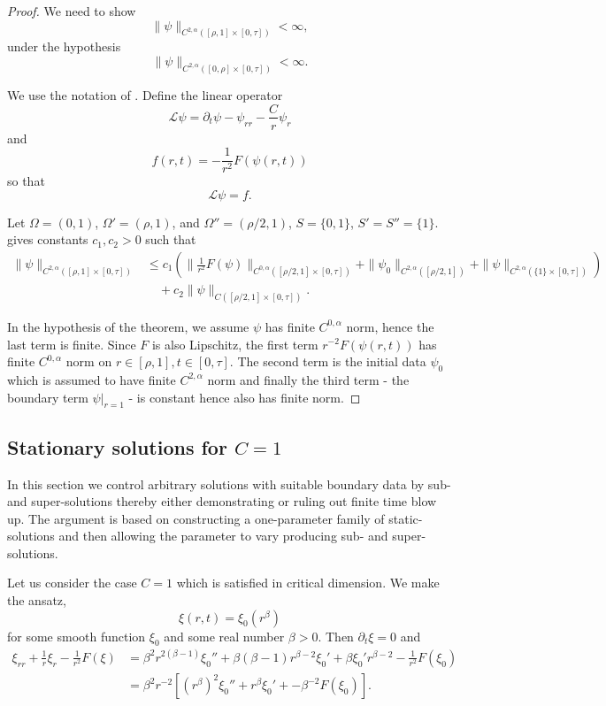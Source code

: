 \documentclass{amsart}
\begin{document}
\begin{proof}
We need to show
\[
\|\psi\|_{C^{2,\alpha}([\rho, 1] \times [0, \tau])} < \infty,
\]
under the hypothesis
\[
\|\psi\|_{C^{2,\alpha}([0, \rho] \times [0, \tau])} < \infty.
\]

We use the notation of \cite[Theorem 10.1]{Ladyzhenskaja:/1967}. Define the linear operator
\[
\mathcal{L} \psi = \partial_t \psi - \psi_{rr} - \frac{C}{r} \psi_r
\]
and
\[
f(r, t) = -\frac{1}{r^2} F(\psi(r, t))
\]
so that
\[
\mathcal{L} \psi = f.
\]

Let \(\Omega = (0, 1)\), \(\Omega' = (\rho, 1)\), and \(\Omega'' = (\rho/2, 1)\), \(S = \{0, 1\}\), \(S' = S'' = \{1\}\). \cite[Theorem 10.1]{Ladyzhenskaja:/1967} gives constants \(c_1, c_2 > 0\) such that
\[
\begin{split}
\|\psi\|_{C^{2,\alpha}([\rho, 1] \times [0, \tau])} &\leq c_1 \left(\|\tfrac{1}{r^2} F(\psi)\|_{C^{0,\alpha}([\rho/2, 1] \times [0, \tau])} + \|\psi_0\|_{C^{2,\alpha}([\rho/2, 1])} + \|\psi\|_{C^{2,\alpha}(\{1\} \times [0, \tau])} \right) \\
&\quad + c_2 \|\psi\|_{C([\rho/2, 1] \times [0, \tau])}.
\end{split}
\]

In the hypothesis of the theorem, we assume \(\psi\) has finite \(C^{0,\alpha}\) norm, hence the last term is finite. Since \(F\) is also Lipschitz, the first term \(r^{-2} F(\psi(r, t))\) has finite \(C^{0,\alpha}\) norm on \(r \in [\rho, 1], t \in [0, \tau]\). The second term is the initial data \(\psi_0\) which is assumed to have finite \(C^{2,\alpha}\) norm and finally the third term - the boundary term \(\psi|_{r=1}\) - is constant hence also has finite norm.
\end{proof}

\subsection*{Stationary solutions for \(C=1\)}

In this section we control arbitrary solutions with suitable boundary data by sub- and super-solutions thereby either demonstrating or ruling out finite time blow up. The argument is based on constructing a one-parameter family of static-solutions and then allowing the parameter to vary producing sub- and super-solutions.


Let us consider the case \(C = 1\) which is satisfied in critical dimension. We make the ansatz,
\[
\xi(r, t) = \xi_0(r^{\beta})
\]
for some smooth function \(\xi_0\) and some real number \(\beta > 0\). Then \(\partial_t \xi = 0\) and
\[
\begin{split}
\xi_{rr} + \frac{1}{r} \xi_r - \frac{1}{r^2} F(\xi) &= \beta^2 r^{2(\beta-1)} \xi_0'' + \beta (\beta - 1) r^{\beta-2} \xi_0' + \beta \xi_0' r^{\beta-2} - \frac{1}{r^2} F(\xi_0) \\
&= \beta^2 r^{-2} \left[(r^{\beta})^2 \xi_0'' + r^{\beta} \xi_0' + - \beta^{-2}F(\xi_0)\right].
\end{split}
\]
\end{document}
